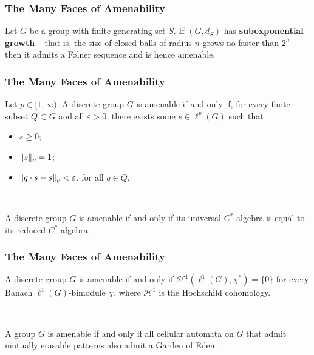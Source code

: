 \documentclass{beamer}
\DeclarePairedDelimiter{\norm}{\lVert}{\rVert}
\theoremstyle{example}
\begin{document}
\begin{frame}
\frametitle{The Many Faces of Amenability}
\begin{corollary}
Let $G$ be a group with finite generating set $S$. If $(G, d_S)$ has \textbf{subexponential growth} -- that is, the size of closed balls of radius $n$ grows no faster than $2^n$ -- then it admits a F{\o}lner sequence and is hence amenable.
\end{corollary}
\end{frame}

\begin{frame}
\frametitle{The Many Faces of Amenability}
\begin{theorem}
Let $p \in [1, \infty)$. A discrete group $G$ is amenable if and only if, for every finite subset $Q \subset G$ and all $\varepsilon > 0$, there exists some $s \in \ell^p(G)$ such that
\begin{itemize}
\item $s \geq 0$;
\item $\norm{s}_p = 1$;
\item $\norm{q \cdot s - s}_p < \varepsilon$, for all $q \in Q$.
\end{itemize}
\end{theorem}
\noindent\\[0.5\baselineskip]
\begin{theorem}
A discrete group $G$ is amenable if and only if its universal $C^*$-algebra is equal to its reduced $C^*$-algebra.
\end{theorem}
\end{frame}

\begin{frame}
\frametitle{The Many Faces of Amenability}
\begin{theorem}[Johnson, 1972]
A discrete group $G$ is amenable if and only if $\mathcal{H}^1(\ell^1(G), \chi^*) = \{0\}$ for every Banach $\ell^1(G)$-bimodule $\chi$, where $\mathcal{H}^1$ is the Hochschild cohomology.
\end{theorem}
\noindent\\[0.5\baselineskip]
\begin{theorem}[Bartholdi, 2010]
A group $G$ is amenable if and only if all cellular automata on $G$ that admit mutually erasable patterns also admit a Garden of Eden.
\end{theorem}
\end{frame}

\end{document}
